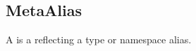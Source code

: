 \subsection{MetaAlias}
\label{concept-MetaAlias}

A  is a  reflecting a type or namespace alias.  




